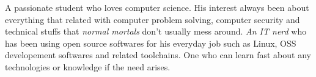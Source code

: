 

\begin{cvparagraph}

A passionate student who loves computer science. His interest always been about everything that related with computer problem solving, computer security and technical stuffs that \textit{normal mortals} don't usually mess around. \textit{An IT nerd} who has been using open source softwares for his everyday job such as Linux, OSS developement softwares and related toolchains. One who can learn fast about any technologies or knowledge if the need arises.
\end{cvparagraph}
